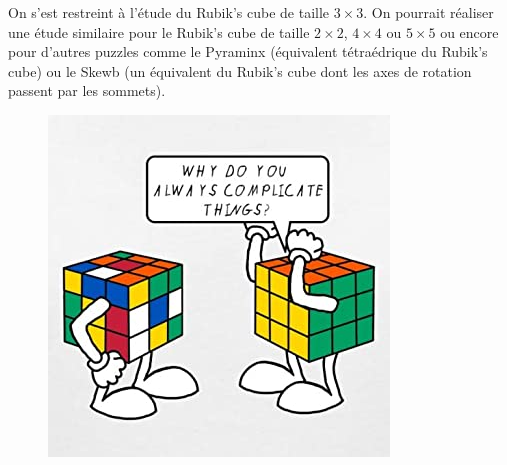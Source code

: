 \documentclass[french]{report}
\begin{document}
On s'est restreint à l'étude du Rubik's cube de taille $3 \times 3$. On pourrait réaliser une étude similaire pour le Rubik's cube de taille $2 \times 2$, $4 \times 4$ ou $5 \times 5$ ou encore pour d'autres puzzles comme le Pyraminx (équivalent tétraédrique du Rubik's cube) ou le Skewb (un équivalent du Rubik's cube dont les axes de rotation passent par les sommets).

\begin{figure}[h!]
  \centering
  \includegraphics[scale=0.4]{figures/blague.jpg}
  \caption{}
  \label{}
\end{figure}




\end{document}
